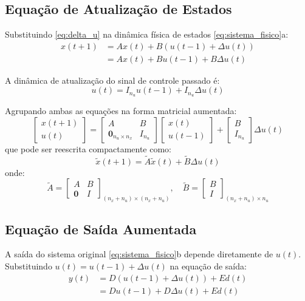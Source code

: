 \documentclass[12pt]{article}
\begin{document}
\subsection{Equação de Atualização de Estados}
Substituindo \eqref{eq:delta_u} na dinâmica física de estados \eqref{eq:sistema_fisico}a:
\begin{align}
x(t+1) &= A x(t) + B (u(t-1) + \Delta u(t)) \nonumber \\
       &= A x(t) + B u(t-1) + B \Delta u(t)
\end{align}

A dinâmica de atualização do sinal de controle passado é:
\begin{equation}
u(t) = I_{n_u} u(t-1) + I_{n_u} \Delta u(t)
\end{equation}

Agrupando ambas as equações na forma matricial aumentada:
\begin{equation}
\begin{bmatrix} x(t+1) \\ u(t) \end{bmatrix} = \begin{bmatrix} A & B \\ \bm{0}_{n_u \times n_x} & I_{n_u} \end{bmatrix} \begin{bmatrix} x(t) \\ u(t-1) \end{bmatrix} + \begin{bmatrix} B \\ I_{n_u} \end{bmatrix} \Delta u(t)
\end{equation}
que pode ser reescrita compactamente como:
\begin{equation}
\label{eq:estado_aumentado_atualizado}
\tilde{x}(t+1) = \tilde{A} \tilde{x}(t) + \tilde{B} \Delta u(t)
\end{equation}
onde:
\begin{equation}
\tilde{A} = \begin{bmatrix} A & B \\ \bm{0} & I \end{bmatrix}_{(n_x+n_u) \times (n_x+n_u)}, \quad \tilde{B} = \begin{bmatrix} B \\ I \end{bmatrix}_{(n_x+n_u) \times n_u}
\end{equation}

\subsection{Equação de Saída Aumentada}
A saída do sistema original \eqref{eq:sistema_fisico}b depende diretamente de $u(t)$. Substituindo $u(t) = u(t-1) + \Delta u(t)$ na equação de saída:
\begin{align}
y(t) &= D (u(t-1) + \Delta u(t)) + E d(t) \nonumber \\
     &= D u(t-1) + D \Delta u(t) + E d(t)
\end{align}
\end{document}
